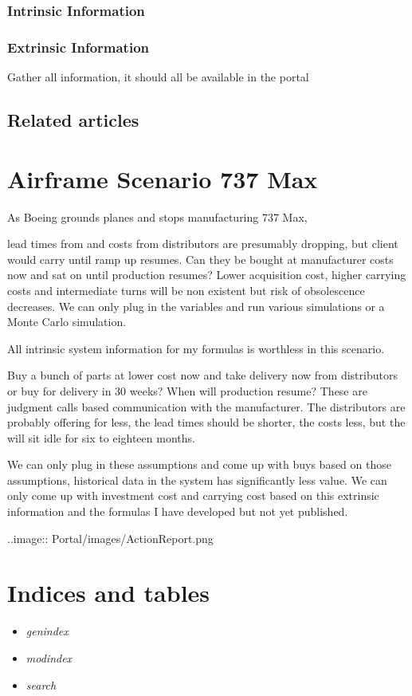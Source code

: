 \documentclass[letterpaper,10pt,english]{sphinxmanual}
\begin{document}
\subsection{Intrinsic Information}
\label{Portal/750-Requisitions:id4}

\subsection{Extrinsic Information}
\label{Portal/750-Requisitions:id5}
Gather all information, it should all be available in the portal


\section{Related articles}
\label{Portal/750-Requisitions:related-articles}

\chapter{Airframe Scenario 737 Max}
\label{Portal/800-737max:airframe-scenario-737-max}\label{Portal/800-737max::doc}
As Boeing grounds planes and stops manufacturing 737 Max,

lead times from and costs from distributors are presumably dropping, but client would carry until ramp up resumes. Can they be bought at manufacturer costs now and sat on until production resumes?  Lower acquisition cost, higher carrying costs and intermediate turns will be non existent but risk of obsolescence decreases. We can only plug in the variables and run various simulations or a Monte Carlo simulation.

All intrinsic system information for my formulas is worthless in this scenario.

Buy a bunch of parts at lower cost now and take delivery now from distributors or buy for delivery in 30 weeks?  When will production resume?   These are judgment calls based communication with the manufacturer.  The distributors are probably offering for less, the lead times should be shorter, the costs less, but the will sit idle for six to eighteen months.

We can only plug in these assumptions and come up with buys based on those assumptions, historical data in the system has significantly less value.  We can only come up with investment cost and carrying cost based on this extrinsic information and the formulas I have developed but not yet published.

..image:: Portal/images/ActionReport.png


\chapter{Indices and tables}
\label{index:indices-and-tables}\begin{itemize}
\item {} 
\emph{genindex}

\item {} 
\emph{modindex}

\item {} 
\emph{search}

\end{itemize}



\renewcommand{\indexname}{Index}
\printindex
\end{document}
